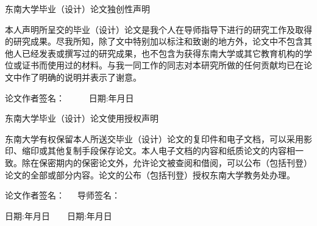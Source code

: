 \newpage
\begin{spacing}{1.43}
\begin{center} 
    \xiaoerhao\heiti
    \vspace*{3em}
    东南大学毕业（设计）论文独创性声明
    \vspace*{1em}
\end{center}

\xiaosihao\songti

本人声明所呈交的毕业（设计）论文是我个人在导师指导下进行的研究工作及取得的研究成果。尽我所知，除了文中特别加以标注和致谢的地方外，论文中不包含其他人已经发表或撰写过的研究成果，也不包含为获得东南大学或其它教育机构的学位或证书而使用过的材料。与我一同工作的同志对本研究所做的任何贡献均已在论文中作了明确的说明并表示了谢意。


\begin{center}
    论文作者签名： \fixedUnderline[6em]{}~~~~~日期:\fixedUnderline[4em]{}年\fixedUnderline[4em]{}月\fixedUnderline[4em]{}日    
\end{center}


\vspace*{4em}


\begin{center} 
    \xiaoerhao\heiti
    \vspace*{1em}
    \hspace*{0em}东南大学毕业（设计）论文使用授权声明
    \vspace*{0.5em}
\end{center} 


东南大学有权保留本人所送交毕业（设计）论文的复印件和电子文档，可以采用影印、缩印或其他复制手段保存论文。本人电子文档的内容和纸质论文的内容相一致。除在保密期内的保密论文外，允许论文被查阅和借阅，可以公布（包括刊登）论文的全部或部分内容。论文的公布（包括刊登）授权东南大学教务处办理。

\begin{center}
    论文作者签名：\fixedUnderline[11em]{}~~~导师签名：\fixedUnderline[13em]{}

    日期:\fixedUnderline[4em]{}年\fixedUnderline[4em]{}月\fixedUnderline[4em]{}日~~~~日期:\fixedUnderline[4em]{}年\fixedUnderline[4em]{}月\fixedUnderline[4em]{}日        
\end{center}

\thispagestyle{empty}
\end{spacing}
